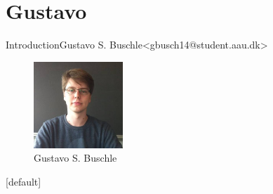\section{Gustavo}

\begin{frame}{Introduction}{Gustavo S. Buschle\newline<gbusch14@student.aau.dk>}
    \begin{figure}[h!]
        \includegraphics[width=0.3\textwidth]{images/gustavo.jpg}
        \caption{Gustavo S. Buschle}
        \centering
    \end{figure}
\end{frame}
[default]

